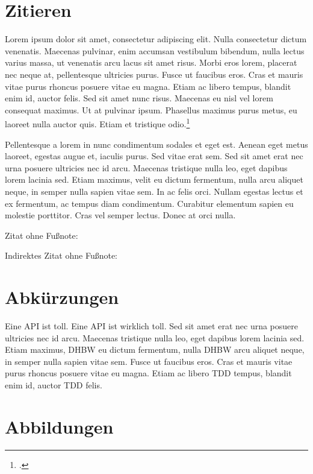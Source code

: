 \documentclass[%
    auto-generate   = true,             %
    debug           = true,             %
    print-ndn       = true,             %
    print-loa       = true,             %
    print-lof       = true,             %
    print-lot       = true,             %
    print-lol       = true,             %
    bib-file        = literature.bib,   %
    plantuml        = true              %
]{udhbwvst}
\begin{document}
\section{Zitieren}

Lorem ipsum dolor sit amet, consectetur adipiscing elit. Nulla consectetur dictum venenatis. Maecenas pulvinar, enim accumsan vestibulum bibendum, nulla lectus varius massa, ut venenatis arcu lacus sit amet risus. Morbi eros lorem, placerat nec neque at, pellentesque ultricies purus. Fusce ut faucibus eros. Cras et mauris vitae purus rhoncus posuere vitae eu magna. Etiam ac libero tempus, blandit enim id, auctor felis. Sed sit amet nunc risus. Maecenas eu nisl vel lorem consequat maximus. Ut at pulvinar ipsum. Phasellus maximus purus metus, eu laoreet nulla auctor quis. Etiam et tristique odio.\footcite[Vgl.][42]{iot_standard_war}

Pellentesque a lorem in nunc condimentum sodales et eget est. Aenean eget metus laoreet, egestas augue et, iaculis purus. Sed vitae erat sem.  Sed sit amet erat nec urna posuere ultricies nec id arcu. Maecenas tristique nulla leo, eget dapibus lorem lacinia sed. Etiam maximus, velit eu dictum fermentum, nulla arcu aliquet neque, in semper nulla sapien vitae sem. In ac felis orci. Nullam egestas lectus et ex fermentum, ac tempus diam condimentum. Curabitur elementum sapien eu molestie porttitor. Cras vel semper lectus. Donec at orci nulla.

Zitat ohne Fußnote: \cite[12]{zwave_alliance_vision}

Indirektes Zitat ohne Fußnote: 

\section{Abkürzungen}

Eine \ac{API} ist toll. Eine \ac{API} ist wirklich toll. Sed sit amet erat nec urna posuere ultricies nec id arcu. Maecenas tristique nulla leo, eget dapibus lorem lacinia sed. Etiam maximus, \ac{DHBW} eu dictum fermentum, nulla \ac{DHBW} arcu aliquet neque, in semper nulla sapien vitae sem. Fusce ut faucibus eros. Cras et mauris vitae purus rhoncus posuere vitae eu magna. Etiam ac libero \ac{TDD} tempus, blandit enim id, auctor \ac{TDD} felis.

\section{Abbildungen}
\end{document}
